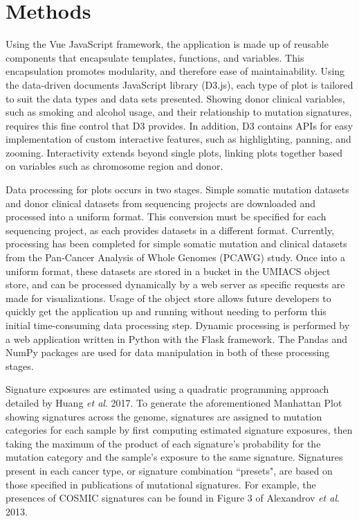 \documentclass[12pt, letterpaper]{article}
\begin{document}
\section{Methods}
Using the Vue JavaScript framework, the application is made up of reusable components that encapsulate templates, functions, and variables.
This encapsulation promotes modularity, and therefore ease of maintainability.
Using the data-driven documents JavaScript library (D3.js)\cite{bostock2011d3}, each type of plot is tailored to suit the data types and data sets presented.
Showing donor clinical variables, such as smoking and alcohol usage, and their relationship to mutation signatures, requires this fine control that D3 provides.
In addition, D3 contains APIs for easy implementation of custom interactive features, such as highlighting, panning, and zooming.
Interactivity extends beyond single plots, linking plots together based on variables such as chromosome region and donor.

Data processing for plots occurs in two stages. 
Simple somatic mutation datasets and donor clinical datasets from sequencing projects are downloaded and processed into a uniform format. 
This conversion must be specified for each sequencing project, as each provides datasets in a different format.
Currently, processing has been completed for simple somatic mutation and clinical datasets from the Pan-Cancer Analysis of Whole Genomes (PCAWG) study.
Once into a uniform format, these datasets are stored in a bucket in the UMIACS object store, and can be processed dynamically by a web server as specific requests are made for visualizations.
Usage of the object store allows future developers to quickly get the application up and running without needing to perform this initial time-consuming data processing step.
Dynamic processing is performed by a web application written in Python with the Flask framework. 
The Pandas and NumPy packages are used for data manipulation in both of these processing stages.

Signature exposures are estimated using a quadratic programming approach detailed by Huang \textit{et al}. 2017\cite{huang2017detecting}.
To generate the aforementioned Manhattan Plot showing signatures across the genome, signatures are assigned to mutation categories for each sample by first computing estimated signature exposures, then taking the maximum of the product of each signature's probability for the mutation category and the sample's exposure to the same signature.
Signatures present in each cancer type, or signature combination ``presets", are based on those specified in publications of mutational signatures.
For example, the presences of COSMIC signatures can be found in Figure 3 of Alexandrov \textit{et al}. 2013\cite{alexandrov2013signatures}.
\end{document}
